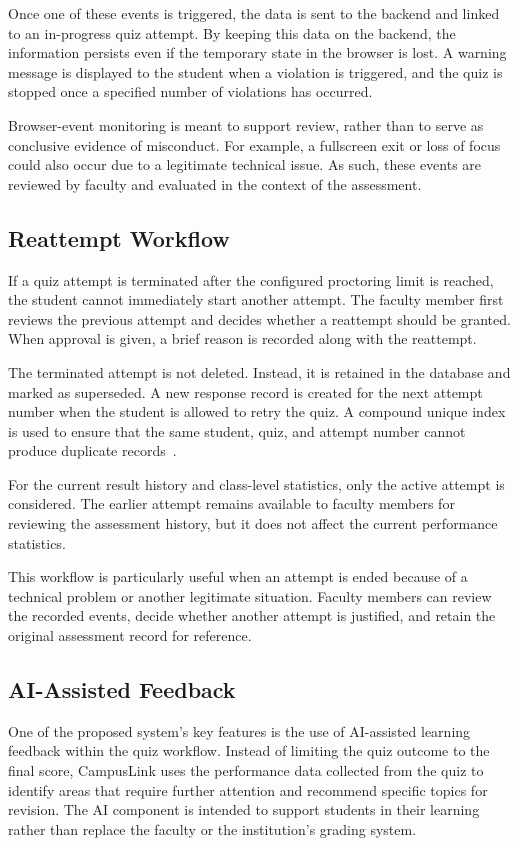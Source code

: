 \documentclass[conference]{IEEEtran}
\begin{document}
Once one of these events is triggered, the data is sent to the backend and linked to an in-progress quiz attempt. By keeping this data on the backend, the information persists even if the temporary state in the browser is lost. A warning message is displayed to the student when a violation is triggered, and the quiz is stopped once a specified number of violations has occurred.

Browser-event monitoring is meant to support review, rather than to serve as conclusive evidence of misconduct. For example, a fullscreen exit or loss of focus could also occur due to a legitimate technical issue. As such, these events are reviewed by faculty and evaluated in the context of the assessment.

\subsection{Reattempt Workflow}

If a quiz attempt is terminated after the configured proctoring limit is reached, the student cannot immediately start another attempt. The faculty member first reviews the previous attempt and decides whether a reattempt should be granted. When approval is given, a brief reason is recorded along with the reattempt.

The terminated attempt is not deleted. Instead, it is retained in the database and marked as superseded. A new response record is created for the next attempt number when the student is allowed to retry the quiz. A compound unique index is used to ensure that the same student, quiz, and attempt number cannot produce duplicate records~\cite{mongoIndex}.

For the current result history and class-level statistics, only the active attempt is considered. The earlier attempt remains available to faculty members for reviewing the assessment history, but it does not affect the current performance statistics.

This workflow is particularly useful when an attempt is ended because of a technical problem or another legitimate situation. Faculty members can review the recorded events, decide whether another attempt is justified, and retain the original assessment record for reference.

\subsection{AI-Assisted Feedback}
One of the proposed system's key features is the use of AI-assisted learning feedback within the quiz workflow. Instead of limiting the quiz outcome to the final score, CampusLink uses the performance data collected from the quiz to identify areas that require further attention and recommend specific topics for revision. The AI component is intended to support students in their learning rather than replace the faculty or the institution's grading system.
\end{document}
